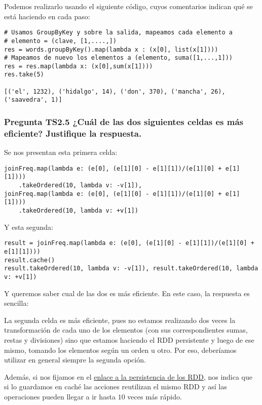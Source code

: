 \documentclass[11pt]{article}
\begin{document}
Podemos realizarlo usando el siguiente código, cuyos comentarios indican qué se está haciendo en cada paso:

\begin{verbatim}
# Usamos GroupByKey y sobre la salida, mapeamos cada elemento a
# elemento = (clave, [1,....,])
res = words.groupByKey().map(lambda x : (x[0], list(x[1])))
# Mapeamos de nuevo los elementos a (elemento, suma([1,...,1]))
res = res.map(lambda x: (x[0],sum(x[1])))
res.take(5)

[('el', 1232), ('hidalgo', 14), ('don', 370), ('mancha', 26), ('saavedra', 1)]
\end{verbatim}


\subsubsection*{Pregunta TS2.5 ¿Cuál de las dos siguientes celdas es más eficiente? Justifique la respuesta.}

Se nos presentan esta primera celda: 

\begin{verbatim}
joinFreq.map(lambda e: (e[0], (e[1][0] - e[1][1])/(e[1][0] + e[1][1])))
    .takeOrdered(10, lambda v: -v[1]),
joinFreq.map(lambda e: (e[0], (e[1][0] - e[1][1])/(e[1][0] + e[1][1])))
    .takeOrdered(10, lambda v: +v[1])
\end{verbatim}

Y esta segunda:

\begin{verbatim}
result = joinFreq.map(lambda e: (e[0], (e[1][0] - e[1][1])/(e[1][0] + e[1][1])))
result.cache()
result.takeOrdered(10, lambda v: -v[1]), result.takeOrdered(10, lambda v: +v[1])
\end{verbatim}

Y queremos saber cual de las dos es más eficiente. En este caso, la respuesta es sencilla: 

La segunda celda es más eficiente, pues no estamos realizando dos veces la transformación de cada uno de los elementos (con sus correspondientes sumas, restas y divisiones) sino que estamos haciendo el RDD persistente y luego de ese mismo, tomando los elementos según un orden u otro. Por eso, deberíamos utilizar en general siempre la segunda opción.

Además, si nos fijamos en el \href{https://spark.apache.org/docs/2.2.0/rdd-programming-guide.html#rdd-persistence}{enlace a la persistencia de los RDD}, nos indica que si lo guardamos en caché las acciones reutilizan el mismo RDD y así las operaciones pueden llegar a ir hasta $10$ veces más rápido.
\end{document}
